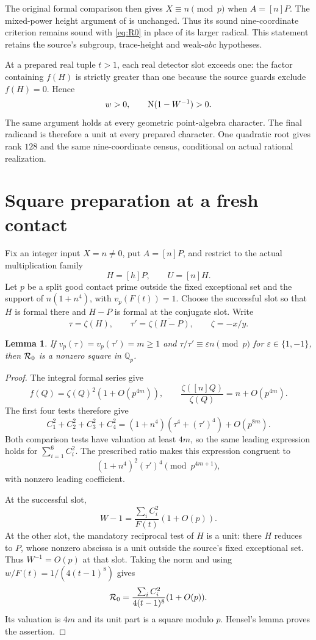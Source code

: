 \documentclass[11pt,a4paper]{article}
\newtheorem{lemma}[proposition]{Lemma}
\newcommand{\Q}{\mathbb Q}\newcommand{\Z}{\mathbb Z}
\begin{document}
The original formal comparison then gives $X\equiv n\pmod p$
when $A=[n]P$. The mixed-power height argument of \cite{Single}
is unchanged. Thus its sound nine-coordinate criterion remains
sound with \eqref{eq:R0} in place of its larger radical.
This statement retains the source's subgroup, trace-height and
weak-$abc$ hypotheses.

At a prepared real tuple $t>1$, each real detector slot exceeds one:
the factor containing $f(H)$ is strictly greater than one because
the source guards exclude $f(H)=0$. Hence
\[
            w>0,\qquad \operatorname{N}(1-W^{-1})>0.
\]
The same argument holds at every geometric point-algebra character.
The final radicand is therefore a unit at every prepared character.
One quadratic root gives rank $128$ and the same nine-coordinate
census, conditional on actual rational realization.

\section{Square preparation at a fresh contact}

Fix an integer input $X=n\ne0$, put $A=[n]P$, and restrict to
the actual multiplication family
\[
                        H=[h]P,\qquad U=[n]H.
\]
Let $p$ be a split good contact prime outside the fixed exceptional
set and the support of $n(1+n^4)$, with $v_p(F(t))=1$.
Choose the successful slot so that $H$ is formal there and $H-P$
is formal at the conjugate slot. Write
\[
 \tau=\zeta(H),\qquad
 \tau'=\overline{\zeta(H-P)},\qquad \zeta=-x/y.
\]

\begin{lemma}\label{lem:lead}
If $v_p(\tau)=v_p(\tau')=m\ge1$ and
$\tau/\tau'\equiv\varepsilon n\pmod p$ for
$\varepsilon\in\{1,-1\}$, then ${\cal R}_0$ is a nonzero
square in $\Q_p$.
\end{lemma}
\begin{proof}
The integral formal series give
\[
 f(Q)=\zeta(Q)^2(1+O(p^{4m})),\qquad
 \frac{\zeta([n]Q)}{\zeta(Q)}=n+O(p^{4m}).
\]
The first four tests therefore give
\[
 C_1^2+C_2^2+C_3^2+C_4^2
 =(1+n^4)(\tau^4+(\tau')^4)+O(p^{8m}).
\]
Both comparison tests have valuation at least $4m$, so the same
leading expression holds for $\sum_{i=1}^6C_i^2$.
The prescribed ratio makes this expression congruent to
\[
                         (1+n^4)^2(\tau')^4
                           \pmod {p^{4m+1}},
\]
with nonzero leading coefficient.

At the successful slot,
\[
 W-1=\frac{\sum_iC_i^2}{F(t)}(1+O(p)).
\]
At the other slot, the mandatory reciprocal test of $H$ is a unit:
there $H$ reduces to $P$, whose nonzero abscissa is a unit outside
the source's fixed exceptional set. Thus $W^{-1}=O(p)$ at that
slot. Taking the norm and using $w/F(t)=1/(4(t-1)^8)$ gives
\[
 {\cal R}_0=\frac{\sum_iC_i^2}{4(t-1)^8}(1+O(p)).
\]
Its valuation is $4m$ and its unit part is a square modulo $p$.
Hensel's lemma proves the assertion.
\end{proof}
\end{document}
